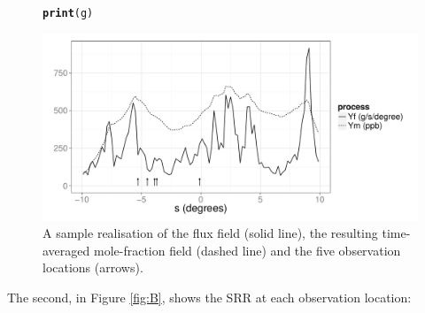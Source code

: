 \documentclass[a4paper,11pt]{article}\usepackage[]{graphicx}\usepackage[]{color}
\makeatletter
\def\maxwidth{ %
  \ifdim\Gin@nat@width>\linewidth
    \linewidth
  \else
    \Gin@nat@width
  \fi
}
\newcommand{\hlstd}[1]{\textcolor[rgb]{0.345,0.345,0.345}{#1}}%
\newcommand{\hlkwd}[1]{\textcolor[rgb]{0.737,0.353,0.396}{\textbf{#1}}}%
\newenvironment{kframe}{%
 \def\at@end@of@kframe{}%
 \ifinner\ifhmode%
  \def\at@end@of@kframe{\end{minipage}}%
  \begin{minipage}{\columnwidth}%
 \fi\fi%
 \def\FrameCommand##1{\hskip\@totalleftmargin \hskip-\fboxsep
 \colorbox{shadecolor}{##1}\hskip-\fboxsep
     \hskip-\linewidth \hskip-\@totalleftmargin \hskip\columnwidth}%
 \MakeFramed {\advance\hsize-\width
   \@totalleftmargin\z@ \linewidth\hsize
   \@setminipage}}%
 {\par\unskip\endMakeFramed%
 \at@end@of@kframe}
\newenvironment{knitrout}{}{} %
\makeatother
\begin{document}
\begin{figure}
\begin{center}
\begin{knitrout}
\color{fgcolor}\begin{kframe}
\begin{alltt}
\hlkwd{print}\hlstd{(g)}
\end{alltt}
\end{kframe}
\includegraphics[width=\maxwidth]{figure/YfYm-plot-1} 

\end{knitrout}
\end{center}
\caption{A sample realisation of the flux field (solid line), the resulting time-averaged mole-fraction field (dashed line) and the five observation locations (arrows).}
\label{fig:YfYm}
\end{figure}






The second, in Figure \ref{fig:B}, shows the SRR at each observation location:
\end{document}
